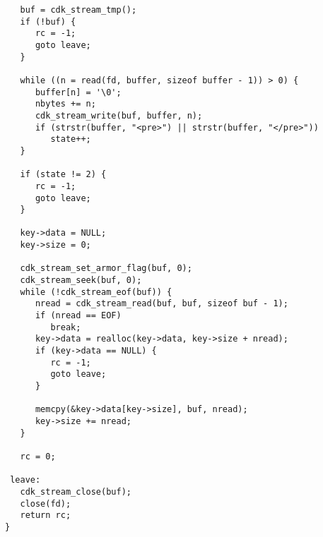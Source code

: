 \begin {verbatim}
   buf = cdk_stream_tmp();
   if (!buf) {
      rc = -1;
      goto leave;
   }

   while ((n = read(fd, buffer, sizeof buffer - 1)) > 0) {
      buffer[n] = '\0';
      nbytes += n;
      cdk_stream_write(buf, buffer, n);
      if (strstr(buffer, "<pre>") || strstr(buffer, "</pre>"))
         state++;
   }

   if (state != 2) {
      rc = -1;
      goto leave;
   }

   key->data = NULL;
   key->size = 0;

   cdk_stream_set_armor_flag(buf, 0);
   cdk_stream_seek(buf, 0);
   while (!cdk_stream_eof(buf)) {
      nread = cdk_stream_read(buf, buf, sizeof buf - 1);
      if (nread == EOF)
         break;
      key->data = realloc(key->data, key->size + nread);
      if (key->data == NULL) {
         rc = -1;
         goto leave;
      }

      memcpy(&key->data[key->size], buf, nread);
      key->size += nread;
   }

   rc = 0;

 leave:
   cdk_stream_close(buf);
   close(fd);
   return rc;
}


\end{verbatim}
